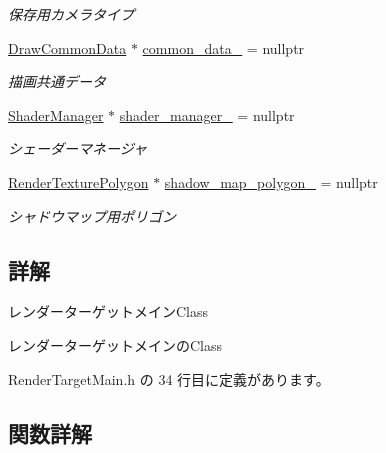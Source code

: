 \begin{DoxyCompactItemize}
\begin{DoxyCompactList}\small\item\em 保存用カメラタイプ \end{DoxyCompactList}\item 
\mbox{\hyperlink{class_draw_common_data}{Draw\+Common\+Data}} $\ast$ \mbox{\hyperlink{class_render_target_main_aa12079eaa4ea1a5f659fdaf85735036c}{common\+\_\+data\+\_\+}} = nullptr
\begin{DoxyCompactList}\small\item\em 描画共通データ \end{DoxyCompactList}\item 
\mbox{\hyperlink{class_shader_manager}{Shader\+Manager}} $\ast$ \mbox{\hyperlink{class_render_target_main_a49a932fb4dc3b63a0d84b7fc324a7268}{shader\+\_\+manager\+\_\+}} = nullptr
\begin{DoxyCompactList}\small\item\em シェーダーマネージャ \end{DoxyCompactList}\item 
\mbox{\hyperlink{class_render_texture_polygon}{Render\+Texture\+Polygon}} $\ast$ \mbox{\hyperlink{class_render_target_main_a3c7da5871b3ed61bae36e05b5037c204}{shadow\+\_\+map\+\_\+polygon\+\_\+}} = nullptr
\begin{DoxyCompactList}\small\item\em シャドウマップ用ポリゴン \end{DoxyCompactList}\end{DoxyCompactItemize}


\subsection{詳解}
レンダーターゲットメイン\+Class 

レンダーターゲットメインの\+Class 

 Render\+Target\+Main.\+h の 34 行目に定義があります。



\subsection{関数詳解}
\mbox{\label{class_render_target_main_a4c43fec8dece5c7cb49d4fb2a53c1796}} 
